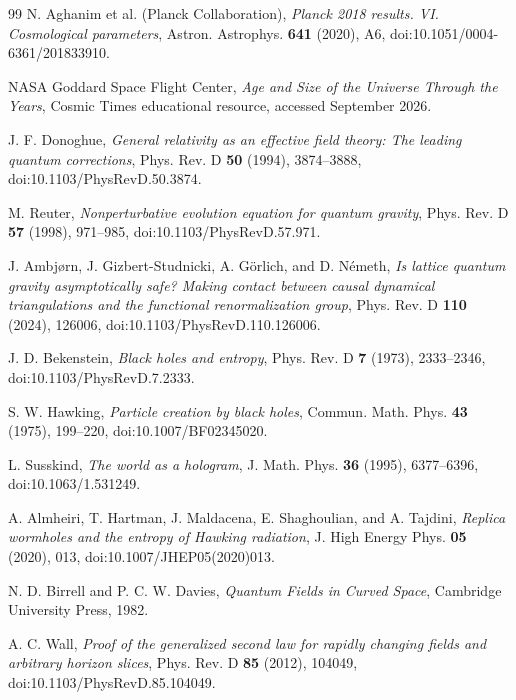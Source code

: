 \documentclass[11pt]{amsart}
\theoremstyle{definition}
\theoremstyle{remark}
\begin{document}
\begin{thebibliography}{99}
N. Aghanim et al. (Planck Collaboration), \emph{Planck 2018 results. VI. Cosmological parameters},
Astron. Astrophys. \textbf{641} (2020), A6,
doi:10.1051/0004-6361/201833910.

NASA Goddard Space Flight Center, \emph{Age and Size of the Universe Through the Years},
Cosmic Times educational resource, accessed September 2026.

J. F. Donoghue, \emph{General relativity as an effective field theory: The leading quantum
corrections}, Phys. Rev. D \textbf{50} (1994), 3874--3888,
doi:10.1103/PhysRevD.50.3874.

M. Reuter, \emph{Nonperturbative evolution equation for quantum gravity},
Phys. Rev. D \textbf{57} (1998), 971--985,
doi:10.1103/PhysRevD.57.971.

J. Ambj{\o}rn, J. Gizbert-Studnicki, A. G\"orlich, and D. N\'emeth,
\emph{Is lattice quantum gravity asymptotically safe? Making contact between causal dynamical
triangulations and the functional renormalization group},
Phys. Rev. D \textbf{110} (2024), 126006,
doi:10.1103/PhysRevD.110.126006.

J. D. Bekenstein, \emph{Black holes and entropy},
Phys. Rev. D \textbf{7} (1973), 2333--2346,
doi:10.1103/PhysRevD.7.2333.

S. W. Hawking, \emph{Particle creation by black holes},
Commun. Math. Phys. \textbf{43} (1975), 199--220,
doi:10.1007/BF02345020.

L. Susskind, \emph{The world as a hologram},
J. Math. Phys. \textbf{36} (1995), 6377--6396,
doi:10.1063/1.531249.

A. Almheiri, T. Hartman, J. Maldacena, E. Shaghoulian, and A. Tajdini,
\emph{Replica wormholes and the entropy of Hawking radiation},
J. High Energy Phys. \textbf{05} (2020), 013,
doi:10.1007/JHEP05(2020)013.

N. D. Birrell and P. C. W. Davies,
\emph{Quantum Fields in Curved Space}, Cambridge University Press, 1982.

A. C. Wall, \emph{Proof of the generalized second law for rapidly changing fields and arbitrary
horizon slices}, Phys. Rev. D \textbf{85} (2012), 104049,
doi:10.1103/PhysRevD.85.104049.
\end{thebibliography}
\end{document}
